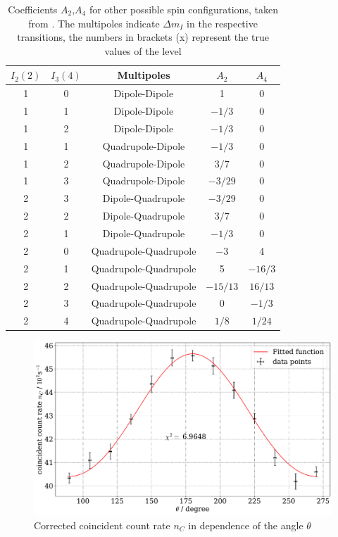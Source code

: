 \documentclass[11pt,a4paper,notitlepage]{scrartcl}
\begin{document}
\begin{table}[H]
	\centering
\begin{tabular}{ccccc}
	\toprule
	$I_{2} (2)$ & $I_{3} (4)$ & Multipoles & $A_{2}$ & $A_{4}$ \\
	\hline 1 & 0 & Dipole-Dipole & 1 & 0 \\
	1 & 1 & Dipole-Dipole & $-1 / 3$ & 0 \\
	1 & 2 & Dipole-Dipole & $-1 / 3$ & 0 \\
	1 & 1 & Quadrupole-Dipole & $-1 / 3$ & 0 \\
	1 & 2 & Quadrupole-Dipole & $3 / 7$ & 0 \\
	1 & 3 & Quadrupole-Dipole & $-3 / 29$ & 0 \\
	2 & 3 & Dipole-Quadrupole & $-3 / 29$ & 0 \\
	2 & 2 & Dipole-Quadrupole & $3 / 7$ & 0 \\
	2 & 1 & Dipole-Quadrupole & $-1 / 3$ & 0 \\
	2 & 0 & Quadrupole-Quadrupole & $-3$ & 4 \\
	2 & 1 & Quadrupole-Quadrupole & 5 & $-16 / 3$ \\
	2 & 2 & Quadrupole-Quadrupole & $-15 / 13$ & $16 / 13$ \\
	2 & 3 & Quadrupole-Quadrupole & 0 & $-1 / 3$ \\
	2 & 4 & Quadrupole-Quadrupole & $1 / 8$ & $1 / 24$\\
	\bottomrule
\end{tabular}
\caption{Coefficients $A_2$,$A_4$ for other possible spin configurations, taken from \cite{bdpaper}. The multipoles indicate $\Delta m_I$ in the respective transitions, the numbers in brackets (x) represent the true values of the level}\label{tab:coeff}
\end{table}
\begin{figure}[htpb]
	\centering
	\includegraphics[width=0.9\linewidth]{figs/main/measurement.pdf}
	\caption{Corrected coincident count rate $n_C$ in dependence of the angle $\theta$}\label{fig:measurement}
\end{figure}
\end{document}
